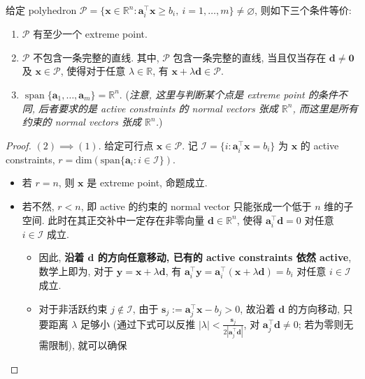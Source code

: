 \begin{thmblock}
给定 polyhedron $\mathcal{P} = \{\bm{x} \in \mathbb{R}^n: \bm{a}_i^\top \bm{x} \geq b_i,~ i=1,\dots,m\} \neq \varnothing$, 则如下三个条件等价:

\begin{enumerate}
\item {}$\mathcal{P}$ 有至少一个 extreme point.


\item {}$\mathcal{P}$ 不包含一条完整的直线. 其中, $\mathcal{P}$ 包含一条完整的直线, 当且仅当存在 $\bm{d} \neq \bm{0}$ 及 $\bm{x} \in \mathcal{P}$, 使得对于任意 $\lambda \in \mathbb{R}$, 有 $\bm{x} + \lambda \bm{d} \in \mathcal{P}$.


\item {}$\operatorname{span}\{\bm{a}_1, \dots, \bm{a}_m\} = \mathbb{R}^n$. (\emph{注意, 这里与判断某个点是 extreme point 的条件不同, 后者要求的是 active constraints 的 normal vectors 张成 $\mathbb{R}^n$, 而这里是所有约束的 normal vectors 张成 $\mathbb{R}^n$.})


\end{enumerate}


\begin{proof}{}
\textbf{$(2) \implies (1)$}. 给定可行点 $\bm{x} \in \mathcal{P}$. 记 $\mathcal{I} = \{i: \bm{a}_i^\top \bm{x} = b_i\}$ 为 $\bm{x}$ 的 active constraints, $r = \text{dim}(\text{span}\{\bm{a}_i: i \in \mathcal{I}\})$.

\begin{itemize}
\item {}若 $r = n$, 则 $\bm{x}$ 是 extreme point, 命题成立.


\item {}若不然, $r<n$, 即 active 的约束的 normal vector 只能张成一个低于 $n$ 维的子空间. 此时在其正交补中一定存在非零向量 $\bm{d} \in \mathbb{R}^n$, 使得 $\bm{a}_i^\top \bm{d} = 0$ 对任意 $i \in \mathcal{I}$ 成立.

\begin{itemize}
\item {}因此, \textbf{沿着 $\bm{d}$ 的方向任意移动, 已有的 active constraints 依然 active}, 数学上即为, 对于 $\bm{y} = \bm{x} + \lambda \bm{d}$, 有 $\bm{a}_i^\top \bm{y} = \bm{a}_i^\top (\bm{x} + \lambda \bm{d}) = b_i$ 对任意 $i \in \mathcal{I}$ 成立.


\item {}对于非活跃约束 $j \notin \mathcal{I}$, 由于 $\bm{s}_j := \bm{a}_j^\top \bm{x} - b_j > 0$, 故沿着 $\bm{d}$ 的方向移动, 只要距离 $\lambda$ 足够小 (通过下式可以反推 $|\lambda| < \frac{\bm{s}_j}{2|\bm{a}_j^\top \bm{d}|}$, 对 $\bm{a}_j^\top \bm{d} \neq 0$; 若为零则无需限制), 就可以确保


\end{itemize}
\end{itemize}
\end{proof}
\end{thmblock}

